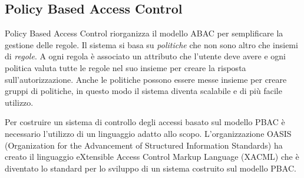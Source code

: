 \subsection{Policy Based Access Control}
\label{sub:PBAC}
Policy Based Access Control riorganizza il modello ABAC per semplificare la gestione delle regole.
Il sistema si basa su \emph{politiche} che non sono altro che insiemi di \emph{regole}. A ogni regola è associato un attributo
che l'utente deve avere e ogni politica valuta tutte le regole nel suo insieme per creare la risposta sull'autorizzazione. Anche
le politiche possono essere messe insieme per creare gruppi di politiche, in questo modo il sistema diventa scalabile e di
più facile utilizzo.\par
Per costruire un sistema di controllo degli accessi basato sul modello PBAC è necessario l'utilizzo di
un linguaggio adatto allo scopo. L'organizzazione OASIS (Organization for the Advancement of
 Structured Information Standards) ha creato il linguaggio eXtensible Access
Control Markup Language (XACML) che è diventato lo standard per lo sviluppo di un sistema costruito sul modello PBAC.
